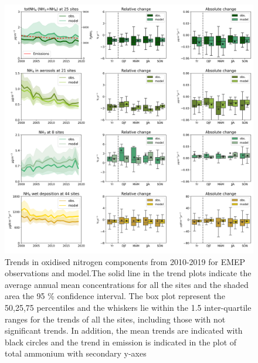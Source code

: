 \begin{figure}
	\centering
	\includegraphics[width=0.74\paperwidth]{FIGS_TRENDS/Nred_trends.png}
	\caption{\label{fig:Nred_trends}Trends in oxidised nitrogen components from 2010-2019 for EMEP observations and model.The solid line in the trend plots indicate the average annual mean concentrations for all the sites and the shaded area the 95 \% confidence interval. The box plot represent the 50,25,75 percentiles and the whiskers lie within the 1.5 inter-quartile ranges for the trends of all the sites, including those with not significant trends. In addition, the mean trends are indicated with black circles and the trend in \nhiii emission is indicated in the plot of total ammonium with secondary y-axes}
\end{figure}



